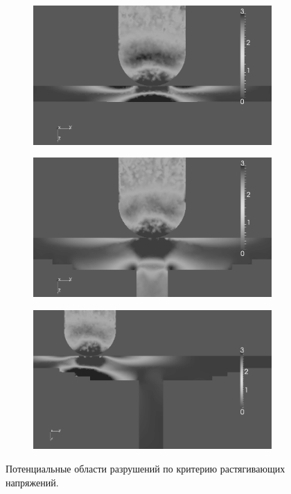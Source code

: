 \begin{figure}[htp]
\centering
\begin{subfigure}[b]{0.3\textwidth}
\center
\includegraphics[width=\textwidth]{png/pkm-experiment/wing-only/tension-2-bw.png}
\end{subfigure}
\begin{subfigure}[b]{0.3\textwidth}
\center
\includegraphics[width=\textwidth]{png/pkm-experiment/wing-stringer/tension-2-bw.png}
\end{subfigure}
\begin{subfigure}[b]{0.3\textwidth}
\center
\includegraphics[width=\textwidth]{png/pkm-experiment/wing-stringer-non-center/tension-2-bw.png}
\end{subfigure}
\caption{Потенциальные области разрушений по критерию растягивающих напряжений.}
\label{pic:pkm_experiment_compare_tension}
\end{figure}

